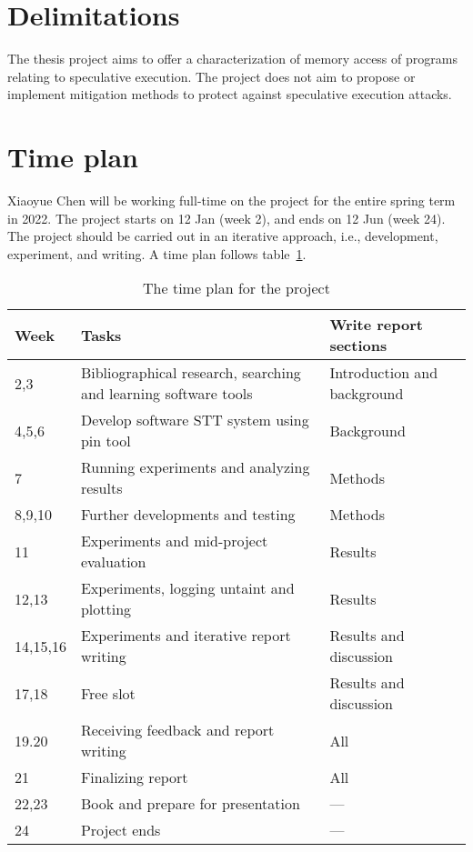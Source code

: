 \documentclass[a4paper]{article}
\begin{document}
\section{Delimitations}
The thesis project aims to offer a characterization of memory access
of programs relating to speculative execution. The project does not
aim to propose or implement mitigation methods to protect against
speculative execution attacks.

\section{Time plan}
Xiaoyue Chen will be working full-time on the project for the entire
spring term in 2022. The project starts on 12 Jan (week 2), and ends
on 12 Jun (week 24). The project should be carried out in an iterative
approach, i.e., development, experiment, and writing. A time plan
follows table~\ref{tab:timeplan}.

\begin{landscape}
\begin{table}[h]
  \centering
  \begin{tabular}{lll}
    \toprule
    Week &  Tasks & Write report sections \\
    \midrule
    2,3 & Bibliographical research, searching and learning software tools & Introduction and background \\
    4,5,6 & Develop software STT system using pin tool & Background \\
    7 & Running experiments and analyzing results & Methods \\
    8,9,10 & Further developments and testing & Methods \\
    11 & Experiments and mid-project evaluation & Results \\
    12,13 & Experiments, logging untaint and plotting & Results \\
    14,15,16 & Experiments and iterative report writing & Results and discussion \\
    17,18 & Free slot & Results and discussion \\
    19.20 & Receiving feedback and report writing & All \\
    21 & Finalizing report & All \\
    22,23 & Book and prepare for presentation & --- \\
    24 & Project ends & --- \\
    \bottomrule
  \end{tabular}
  \caption{The time plan for the project}
  \label{tab:timeplan}
\end{table}
\end{landscape}


 
\end{document}
